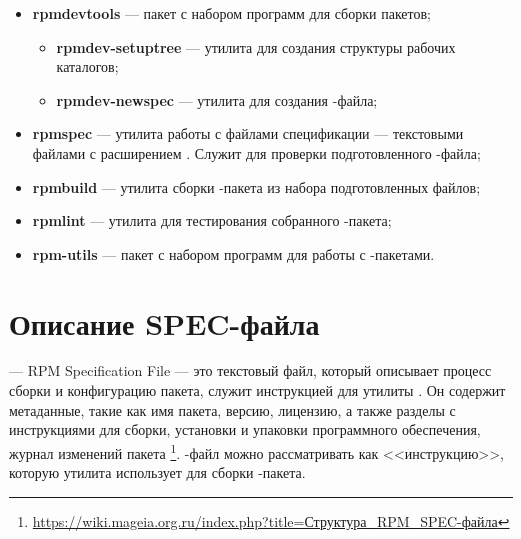 \begin{itemize}
	\item \textbf{rpmdevtools} --- пакет с набором программ для сборки пакетов; 
	
	\begin{itemize}
		\item \textbf{rpmdev-setuptree} --- утилита для создания структуры рабочих каталогов;
		\item \textbf{rpmdev-newspec} --- утилита для создания -файла;
	\end{itemize}
	
	\item \textbf{rpmspec} --- утилита работы с файлами спецификации --- текстовыми файлами с расширением . Служит для проверки подготовленного -файла;
	
	\item \textbf{rpmbuild} --- утилита сборки -пакета из набора подготовленных файлов;
	
	\item \textbf{rpmlint} --- утилита для тестирования собранного -пакета;
	
	\item \textbf{rpm-utils} --- пакет с набором программ для работы с -пакетами.
\end{itemize}


\section{Описание SPEC-файла}
 --- RPM Specification File --- это текстовый файл, который описывает процесс сборки и конфигурацию 
пакета, служит инструкцией для утилиты . Он содержит метаданные, такие как имя пакета, версию, 
лицензию, а также разделы с инструкциями для сборки, установки и упаковки программного обеспечения, журнал 
изменений пакета%
\footnote{\href{https://wiki.mageia.org.ru/index.php?title=\%D0\%A1\%D1\%82\%D1\%80\%D1\%83\%D0\%BA\%D1\%82\%D1\%83\%D1\%80\%D0\%B0_RPM_SPEC-\%D1\%84\%D0\%B0\%D0\%B9\%D0\%BB\%D0\%B0}%
{https://wiki.mageia.org.ru/index.php?title=Структура\_RPM\_SPEC-файла}}. %
-файл можно рассматривать как <<инструкцию>>, которую утилита  использует для сборки -пакета.

